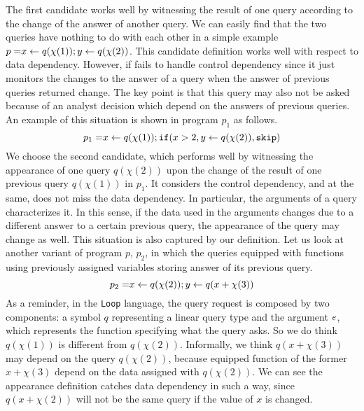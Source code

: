\documentclass[a4paper,11pt]{article}
\begin{document}
{
   The first candidate works well by witnessing the result of one query according to the change of the answer of another query. We can easily find that the two queries have nothing to do with each other in a simple example   
%
    $ p = \mathrel{ x \leftarrow q(\chi(1)) } ; \mathrel{ y \leftarrow q(\chi(2)) }$. This candidate definition works well with respect to data dependency. However, if fails to handle control dependency since it just monitors the changes to the answer of a query when the answer of previous queries returned change. The key point is that this query may also not be asked because of an analyst decision which depend on the answers of previous queries. An example of this situation is shown in program $p_1$ as follows.
    \[
      p_1 = \mathrel{ x \leftarrow q(\chi(1)) } ; \mathtt{if}( x > 2 ,\mathrel{ y \leftarrow q(\chi(2)) }, \mathtt{skip} )
   	\]
   	We choose the second candidate, which performs well by witnessing the appearance of one query $q(\chi(2))$ upon the change of the result of one previous query $q(\chi(1))$ in $p_1$. It considers the control dependency, and at the same, does not miss the data dependency. In particular, the arguments of a query characterizes it. In this sense, if the data used in the arguments changes due to a different answer to a certain previous query, the appearance of the query may change as well. This situation is also captured by our definition. Let us look at another variant of program $p$, $p_2$, in which the queries equipped with functions using previously assigned variables storing answer of its previous query.
    \[
      p_2 = \mathrel{ x \leftarrow q(\chi(2)) } ; \mathrel{ y \leftarrow q(x+\chi(3)) }
   	\]
    As a reminder, in the {\tt Loop} language, the query request is composed by two components: a symbol $q$ representing a linear query type and the argument $e$, which represents the function specifying what the query asks. So we do think $q(\chi(1))$ is different from $q(\chi(2))$. Informally, we think $q(x+\chi(3))$ may depend on the query $q(\chi(2))$, because equipped function of the former $x+\chi(3)$ depend on the data assigned with $q(\chi(2))$. We can see the appearance definition catches data dependency in such a way, since $q(x+\chi(2))$ will not be the same query if the value of $x$ is changed.    
}
\end{document}
